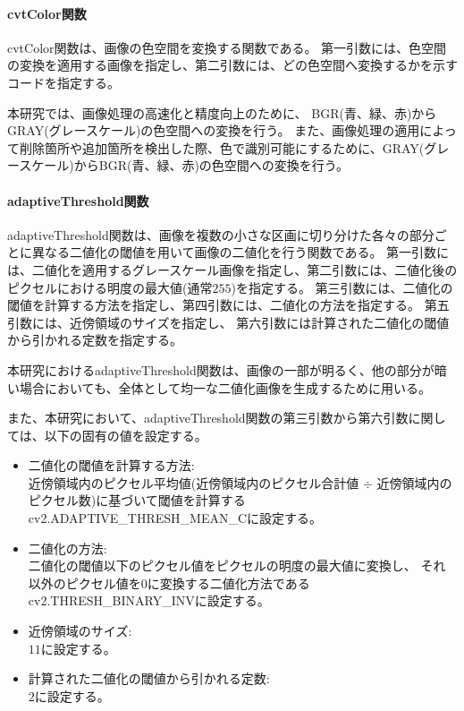 \paragraph{cvtColor関数}
cvtColor関数は、画像の色空間を変換する関数である。
第一引数には、色空間の変換を適用する画像を指定し、第二引数には、どの色空間へ変換するかを示すコード\cite{ColorCode}を指定する。
\par
本研究では、画像処理の高速化と精度向上のために、
BGR(青、緑、赤)からGRAY(グレースケール)の色空間への変換を行う。
また、画像処理の適用によって削除箇所や追加箇所を検出した際、色で識別可能にするために、GRAY(グレースケール)からBGR(青、緑、赤)の色空間への変換を行う。
\paragraph{adaptiveThreshold関数}
adaptiveThreshold関数は、画像を複数の小さな区画に切り分けた各々の部分ごとに異なる二値化の閾値を用いて画像の二値化を行う関数である。
第一引数には、二値化を適用するグレースケール画像を指定し、第二引数には、二値化後のピクセルにおける明度の最大値(通常$255$)を指定する。
第三引数には、二値化の閾値を計算する方法を指定し、第四引数には、二値化の方法を指定する。
第五引数には、近傍領域のサイズを指定し、
第六引数には計算された二値化の閾値から引かれる定数を指定する。
\par
本研究におけるadaptiveThreshold関数は、画像の一部が明るく、他の部分が暗い場合においても、全体として均一な二値化画像を生成するために用いる。
\par
また、本研究において、adaptiveThreshold関数の第三引数から第六引数に関しては、以下の固有の値を設定する。
\begin{itemize}
      \setlength{\itemsep}{0pt}
            \setlength{\parsep}{0pt}
      \item 二値化の閾値を計算する方法:\\
            近傍領域内のピクセル平均値(近傍領域内のピクセル合計値 $\div$ 近傍領域内のピクセル数)に基づいて閾値を計算するcv2.ADAPTIVE\_THRESH\_MEAN\_C\cite{AdaptiveThreshold}に設定する。
      \item 二値化の方法:\\
            二値化の閾値以下のピクセル値をピクセルの明度の最大値に変換し、
            それ以外のピクセル値を$0$に変換する二値化方法であるcv2.THRESH\_BINARY\_INV\cite{Threshold}に設定する。
      \item 近傍領域のサイズ:\\
            $11$に設定する。
      \item 計算された二値化の閾値から引かれる定数:\\
            $2$に設定する。
\end{itemize}
